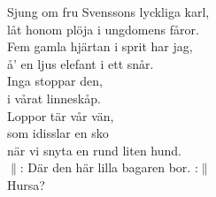 \documentclass[a6paper, 10pt, twoside]{article}
\begin{document}
\begin{center}
\end{center}
\begin{lyrics}
\small Sjung om fru Svenssons lyckliga karl,\\
låt honom plöja i ungdomens fåror.\\
Fem gamla hjärtan i sprit har jag,\\
å' en ljus elefant i ett snår.\\
Inga stoppar den,\\
i vårat linneskåp.\\
Loppor tär vår vän, \\
som idisslar en sko \\
när vi snyta en rund liten hund.\\
$\|$: Där den här lilla bagaren bor. :$\|$\\
Hursa?
\end{lyrics}
\end{document}
